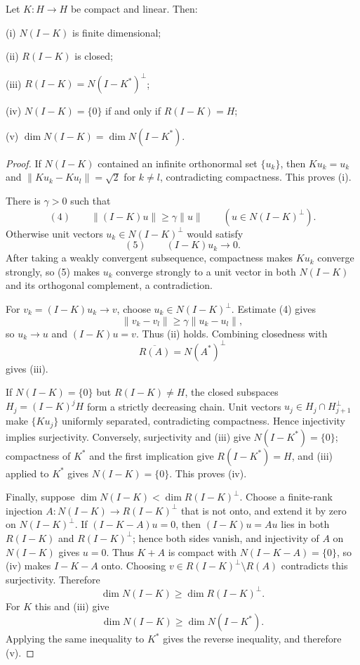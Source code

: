 \begin{theorem}
\label{thm:fredholm-alternative}
Let $K:H\to H$ be compact and linear. Then:

(i) $N(I-K)$ is finite dimensional;

(ii) $R(I-K)$ is closed;

(iii) $R(I-K)=N(I-K^*)^\perp$;

(iv) $N(I-K)=\{0\}$ if and only if $R(I-K)=H$;

(v) $\dim N(I-K)=\dim N(I-K^*)$.
\end{theorem}
\begin{proof}
\sketch If $N(I-K)$ contained an infinite orthonormal set $\{u_k\}$, then $Ku_k=u_k$ and $\|Ku_k-Ku_l\|=\sqrt2$ for $k\ne l$, contradicting compactness. This proves (i).

There is $\gamma>0$ such that
\[
(4)\qquad
\|(I-K)u\|\geq\gamma\|u\|
\qquad(u\in N(I-K)^\perp).
\]
Otherwise unit vectors $u_k\in N(I-K)^\perp$ would satisfy
\[
(5)\qquad (I-K)u_k\to0.
\]
After taking a weakly convergent subsequence, compactness makes $Ku_k$ converge strongly, so (5) makes $u_k$ converge strongly to a unit vector in both $N(I-K)$ and its orthogonal complement, a contradiction.

For $v_k=(I-K)u_k\to v$, choose $u_k\in N(I-K)^\perp$. Estimate (4) gives
\[
\|v_k-v_l\|\geq\gamma\|u_k-u_l\|,
\]
so $u_k\to u$ and $(I-K)u=v$. Thus (ii) holds. Combining closedness with
\[
\overline{R(A)}=N(A^*)^\perp
\]
gives (iii).

If $N(I-K)=\{0\}$ but $R(I-K)\ne H$, the closed subspaces $H_j=(I-K)^jH$ form a strictly decreasing chain. Unit vectors $u_j\in H_j\cap H_{j+1}^\perp$ make $\{Ku_j\}$ uniformly separated, contradicting compactness. Hence injectivity implies surjectivity. Conversely, surjectivity and (iii) give $N(I-K^*)=\{0\}$; compactness of $K^*$ and the first implication give $R(I-K^*)=H$, and (iii) applied to $K^*$ gives $N(I-K)=\{0\}$. This proves (iv).

Finally, suppose $\dim N(I-K)<\dim R(I-K)^\perp$. Choose a finite-rank injection $A:N(I-K)\to R(I-K)^\perp$ that is not onto, and extend it by zero on $N(I-K)^\perp$. If $(I-K-A)u=0$, then $(I-K)u=Au$ lies in both $R(I-K)$ and $R(I-K)^\perp$; hence both sides vanish, and injectivity of $A$ on $N(I-K)$ gives $u=0$. Thus $K+A$ is compact with $N(I-K-A)=\{0\}$, so (iv) makes $I-K-A$ onto. Choosing $v\in R(I-K)^\perp\setminus R(A)$ contradicts this surjectivity. Therefore
\[
\dim N(I-K)\geq\dim R(I-K)^\perp.
\]
For $K$ this and (iii) give
\[
\dim N(I-K)\geq\dim N(I-K^*).
\]
Applying the same inequality to $K^*$ gives the reverse inequality, and therefore (v).
\end{proof}

